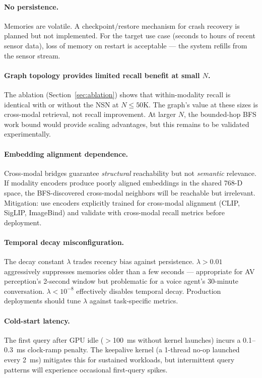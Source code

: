 \documentclass[11pt]{article}
\begin{document}
\paragraph{No persistence.}
Memories are volatile. A checkpoint/restore mechanism for crash recovery
is planned but not implemented. For the target use case (seconds to
hours of recent sensor data), loss of memory on restart is acceptable
--- the system refills from the sensor stream.

\paragraph{Graph topology provides limited recall benefit at small $N$.}
The ablation (Section~\ref{sec:ablation}) shows that within-modality
recall is identical with or without the NSN at $N \leq 50$K. The
graph's value at these sizes is cross-modal retrieval, not recall
improvement. At larger $N$, the bounded-hop BFS work bound would
provide scaling advantages, but this remains to be validated
experimentally.

\paragraph{Embedding alignment dependence.}
Cross-modal bridges guarantee \emph{structural} reachability but not
\emph{semantic} relevance. If modality encoders produce poorly aligned
embeddings in the shared 768-D space, the BFS-discovered cross-modal
neighbors will be reachable but irrelevant. Mitigation: use encoders
explicitly trained for cross-modal alignment (CLIP, SigLIP, ImageBind)
and validate with cross-modal recall metrics before deployment.

\paragraph{Temporal decay misconfiguration.}
The decay constant $\lambda$ trades recency bias against persistence.
$\lambda > 0.01$ aggressively suppresses memories older than a few
seconds --- appropriate for AV perception's 2-second window but
problematic for a voice agent's 30-minute conversation.
$\lambda < 10^{-8}$ effectively disables temporal decay. Production
deployments should tune $\lambda$ against task-specific metrics.

\paragraph{Cold-start latency.}
The first query after GPU idle ($>$100~ms without kernel launches)
incurs a 0.1--0.3~ms clock-ramp penalty. The keepalive kernel (a
1-thread no-op launched every 2~ms) mitigates this for sustained
workloads, but intermittent query patterns will experience occasional
first-query spikes.
\end{document}
